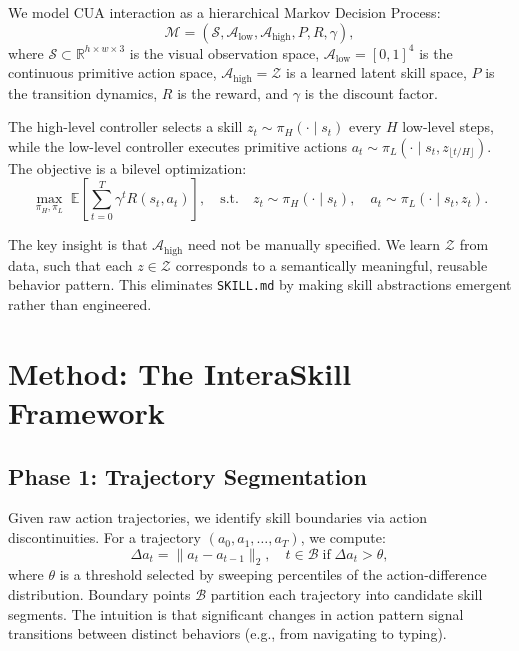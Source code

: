 \documentclass{article}
\begin{document}
We model CUA interaction as a hierarchical Markov Decision Process:
\begin{equation}
\mathcal{M} = (\mathcal{S}, \mathcal{A}_{\text{low}}, \mathcal{A}_{\text{high}}, P, R, \gamma),
\end{equation}
where $\mathcal{S} \subset \mathbb{R}^{h \times w \times 3}$ is the visual observation space, $\mathcal{A}_{\text{low}} = [0,1]^4$ is the continuous primitive action space, $\mathcal{A}_{\text{high}} = \mathcal{Z}$ is a learned latent skill space, $P$ is the transition dynamics, $R$ is the reward, and $\gamma$ is the discount factor.

The high-level controller selects a skill $z_t \sim \pi_H(\cdot \mid s_t)$ every $H$ low-level steps, while the low-level controller executes primitive actions $a_t \sim \pi_L(\cdot \mid s_t, z_{\lfloor t/H \rfloor})$. The objective is a bilevel optimization:
\begin{equation}
\max_{\pi_H, \pi_L} \; \mathbb{E}\left[\sum_{t=0}^{T} \gamma^t R(s_t, a_t)\right], \quad \text{s.t.} \quad z_t \sim \pi_H(\cdot \mid s_t), \quad a_t \sim \pi_L(\cdot \mid s_t, z_t).
\end{equation}

The key insight is that $\mathcal{A}_{\text{high}}$ need not be manually specified. We learn $\mathcal{Z}$ from data, such that each $z \in \mathcal{Z}$ corresponds to a semantically meaningful, reusable behavior pattern. This eliminates \texttt{SKILL.md} by making skill abstractions emergent rather than engineered.

\section{Method: The InteraSkill Framework}
\label{sec:method}

\subsection{Phase 1: Trajectory Segmentation}

Given raw action trajectories, we identify skill boundaries via action discontinuities. For a trajectory $(a_0, a_1, \ldots, a_T)$, we compute:
\begin{equation}
\Delta a_t = \|a_t - a_{t-1}\|_2, \quad t \in \mathcal{B} \;\text{if}\; \Delta a_t > \theta,
\end{equation}
where $\theta$ is a threshold selected by sweeping percentiles of the action-difference distribution. Boundary points $\mathcal{B}$ partition each trajectory into candidate skill segments. The intuition is that significant changes in action pattern signal transitions between distinct behaviors (e.g., from navigating to typing).
\end{document}
